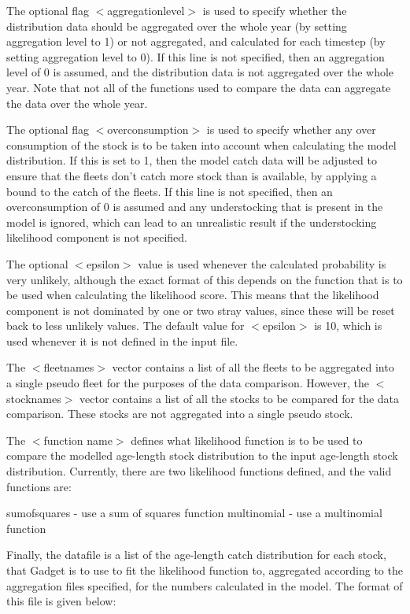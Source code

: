 \documentclass[10pt,twoside]{book}
\begin{document}
The optional flag $<$aggregationlevel$>$ is used to specify whether the distribution data should be aggregated over the whole year (by setting aggregation level to 1) or not aggregated, and calculated for each timestep (by setting aggregation level to 0).  If this line is not specified, then an aggregation level of 0 is assumed, and the distribution data is not aggregated over the whole year.  Note that not all of the functions used to compare the data can aggregate the data over the whole year.

\bigskip
The optional flag $<$overconsumption$>$ is used to specify whether any over consumption of the stock is to be taken into account when calculating the model distribution.  If this is set to 1, then the model catch data will be adjusted to ensure that the fleets don't catch more stock than is available, by applying a bound to the catch of the fleets.  If this line is not specified, then an overconsumption of 0 is assumed and any understocking that is present in the model is ignored, which can lead to an unrealistic result if the understocking likelihood component is not specified.

\bigskip
The optional $<$epsilon$>$ value is used whenever the calculated probability is very unlikely, although the exact format of this depends on the function that is to be used when calculating the likelihood score.  This means that the likelihood component is not dominated by one or two stray values, since these will be reset back to less unlikely values.  The default value for $<$epsilon$>$ is 10, which is used whenever it is not defined in the input file.

\bigskip
The $<$fleetnames$>$ vector contains a list of all the fleets to be aggregated into a single pseudo fleet for the purposes of the data comparison.  However, the $<$stocknames$>$ vector contains a list of all the stocks to be compared for the data comparison.  These stocks are not aggregated into a single pseudo stock.

\bigskip
The $<$function name$>$ defines what likelihood function is to be used to compare the modelled age-length stock distribution to the input age-length stock distribution.  Currently, there are two likelihood functions defined, and the  valid functions are:

\bigskip
sumofsquares - use a sum of squares function\newline
multinomial - use a multinomial function

\bigskip
Finally, the datafile is a list of the age-length catch distribution for each stock, that Gadget is to use to fit the likelihood function to, aggregated according to the aggregation files specified, for the numbers calculated in the model.  The format of this file is given below:
\end{document}
